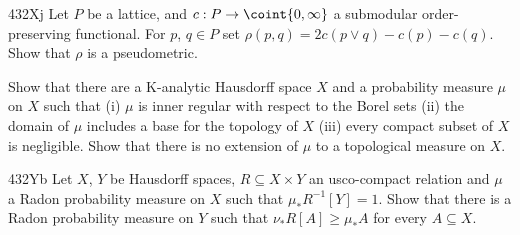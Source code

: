 {\spheader 432Xj 
Let $P$ be a lattice, and $c:P\to\coint{0,\infty}$ a submodular 
order-preserving functional.    
For $p$, $q\in P$ set $\rho(p,q)=2c(p\vee q)-c(p)-c(q)$.   Show that $\rho$ 
is a pseudometric. 
      
Show that there are a K-analytic Hausdorff space $X$ and a probability 
measure $\mu$ on $X$ such that (i) $\mu$ is inner regular with respect 
to the Borel sets (ii) the domain of $\mu$ includes a base for the 
topology of $X$ (iii) every compact subset of $X$ is negligible.   Show 
that there is no extension of $\mu$ to a topological measure on $X$. 
 
\spheader 432Yb 
Let $X$, $Y$ be Hausdorff spaces, $R\subseteq X\times Y$ an usco-compact 
relation and $\mu$ a Radon probability measure on $X$ such that  
$\mu_*R^{-1}[Y]=1$.   Show that there is a Radon probability measure on $Y$ 
such that $\nu_*R[A]\ge\mu_*A$ for every $A\subseteq X$. 
       
      
      
}%
      
      
